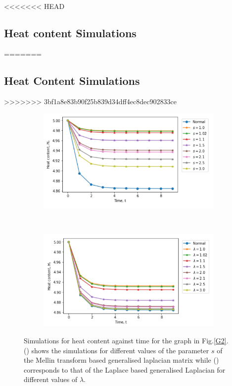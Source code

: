 \documentclass[10pt,a4paper]{article}
\begin{document}
    
    
<<<<<<< HEAD
    \subsection{Heat content Simulations}
=======
    \subsection{Heat Content Simulations}
>>>>>>> 3bf1a8e83b90f25b839d34dff4ec8dec902833ce
    
    \begin{figure}[H]
    	\centering
    	\begin{subfigure}[b]{0.5\textwidth}
    		\includegraphics[width= \textwidth]{images/Mellin-heatcontent.png}
    		\caption{}
    		\label{mellin-heatcont}
    	\end{subfigure}~
    	\begin{subfigure}[b]{0.5\textwidth}
    		\includegraphics[width= \textwidth]{images/Laplace-heatcontent.png}
    		\caption{ }
    		\label{laplace-heatcont}
    	\end{subfigure}
    	\caption{Simulations for heat content against time for the graph in Fig.\ref{G2}. () shows the simulations for different values of the parameter $s$ of the Mellin transform based generalised laplacian matrix while () corresponds to that of the Laplace based generalised Laplacian for different values of $\lambda$. }
    	\label{}
    \end{figure}
 
\end{document}
